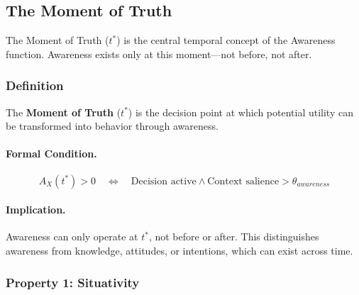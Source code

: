 \subsection{The Moment of Truth}
\label{subsec:11-2-moment-of-truth}


The Moment of Truth ($t^*$) is the central temporal concept of the Awareness
function. Awareness exists only at this moment---not before, not after.

\subsubsection{Definition}

\begin{definition}
\label{def:moment-of-truth}
The \textbf{Moment of Truth} ($t^*$) is the decision point at which potential 
utility can be transformed into behavior through awareness.
\end{definition}

\paragraph{Formal Condition.}
\begin{equation}
A_X(t^*) > 0 \quad \Leftrightarrow \quad \text{Decision active} \wedge \text{Context salience} > \theta_{awareness}
\end{equation}

\paragraph{Implication.}
Awareness can only operate at $t^*$, not before or after. This distinguishes
awareness from knowledge, attitudes, or intentions, which can exist across time.

\subsubsection{Property 1: Situativity}

